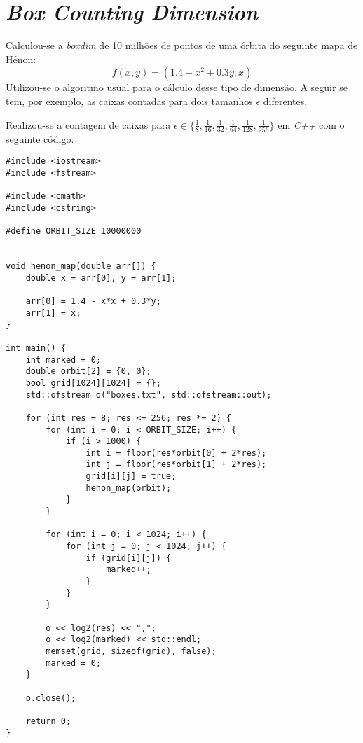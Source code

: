 \documentclass{article}[twocolumn]
\begin{document}
	\section{\textit{Box Counting Dimension}}
	Calculou-se a \textit{boxdim} de 10 milh\~oes de pontos  de uma \'orbita do
	seguinte mapa de H\'enon:
	\begin{equation}
		f(x, y) = (1.4 - x^2 + 0.3y, x)
		\nonumber
	\end{equation}
	Utilizou-se o algoritmo usual para o c\'alculo desse tipo de dimens\~ao. A seguir se
	tem, por exemplo, as caixas contadas para dois tamanhos $\epsilon$ diferentes.
	\begin{figure}[H]
	\end{figure}
	Realizou-se a contagem de caixas para $\epsilon \in \{\frac{1}{8}, \frac{1}{16},
	\frac{1}{32}, \frac{1}{64}, \frac{1}{128}, \frac{1}{256}\}$ em \textit{C++} com o seguinte
	c\'odigo.
	\begin{verbatim}
#include <iostream>
#include <fstream>

#include <cmath>
#include <cstring>

#define ORBIT_SIZE 10000000


void henon_map(double arr[]) {
    double x = arr[0], y = arr[1];
    
    arr[0] = 1.4 - x*x + 0.3*y;
    arr[1] = x;
}

int main() {
    int marked = 0;
    double orbit[2] = {0, 0};
    bool grid[1024][1024] = {};
    std::ofstream o("boxes.txt", std::ofstream::out);

    for (int res = 8; res <= 256; res *= 2) {
        for (int i = 0; i < ORBIT_SIZE; i++) {
            if (i > 1000) {
                int i = floor(res*orbit[0] + 2*res);
                int j = floor(res*orbit[1] + 2*res);
                grid[i][j] = true;
                henon_map(orbit);
            }
        }

        for (int i = 0; i < 1024; i++) {
            for (int j = 0; j < 1024; j++) {
                if (grid[i][j]) {
                    marked++;
                }
            }
        }

        o << log2(res) << ",";
        o << log2(marked) << std::endl;
        memset(grid, sizeof(grid), false);
        marked = 0;
    }

    o.close();

    return 0;
}

	\end{verbatim}
\end{document}
